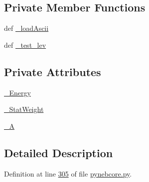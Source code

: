 \subsection*{Private Member Functions}
\begin{DoxyCompactItemize}
\item 
def \hyperlink{classpyneb_1_1core_1_1pynebcore_1_1___atom_data_ascii_aa3a0c51a83be02bbbb64bdd10b4ea61e}{\-\_\-load\-Ascii}
\item 
def \hyperlink{classpyneb_1_1core_1_1pynebcore_1_1___atom_data_ascii_ad2a85bdc0d1803e4b5fe7b77aecc0ff9}{\-\_\-test\-\_\-lev}
\end{DoxyCompactItemize}
\subsection*{Private Attributes}
\begin{DoxyCompactItemize}
\item 
\hyperlink{classpyneb_1_1core_1_1pynebcore_1_1___atom_data_ascii_af9153c0218e68a785d82510cb2ee6248}{\-\_\-\-Energy}
\item 
\hyperlink{classpyneb_1_1core_1_1pynebcore_1_1___atom_data_ascii_ac3e956654089ac966a877dbaa003e3ea}{\-\_\-\-Stat\-Weight}
\item 
\hyperlink{classpyneb_1_1core_1_1pynebcore_1_1___atom_data_ascii_ae3bb56f0dd8397279d1e394768404903}{\-\_\-\-A}
\end{DoxyCompactItemize}


\subsection{Detailed Description}


Definition at line \hyperlink{pynebcore_8py_source_l00305}{305} of file \hyperlink{pynebcore_8py_source}{pynebcore.\-py}.



